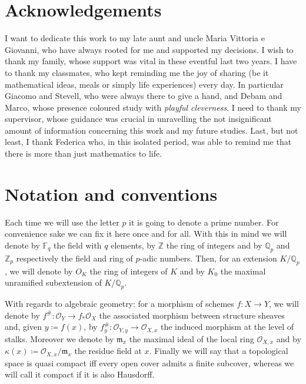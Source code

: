 \section*{Acknowledgements}
I want to dedicate this work to my late aunt and uncle Maria Vittoria e Giovanni,
who have always rooted for me and supported my decisions.
I wish to thank my family, whose support was vital in these eventful last two years.
I have to thank my classmates, who kept reminding me the joy of sharing
(be it mathematical ideas, meals or simply life experiences) every day.
In particular Giacomo and Stevell, who were always there to give a hand, and 
Debam and Marco, whose presence coloured study with \emph{playful cleverness}.
I need to thank my supervisor, whose guidance was crucial in unravelling
the not insignificant amount of information concerning this work and my future studies.
Last, but not least, I thank Federica who, in this isolated period,
was able to remind me that there is more than just mathematics to life.
\newpage


\section*{Notation and conventions}
Each time we will use the letter $p$ it is going to denote a prime number.
For convenience sake we can fix it here once and for all.
With this in mind we will denote by $\mathbb{F}_{q}$ the field with $q$ elements,
by $\mathbb{Z}$ the ring of integers and by $\mathbb{Q}_p$ and $\mathbb{Z}_{p}$
respectively the field and ring of $p$-adic numbers.
Then, for an extension $K/\mathbb{Q}_p$, we will denote by $O_K$ the ring of
integers of $K$ and by $K_0$ the maximal unramified subextension of $K/\mathbb{Q}_p$.

With regards to algebraic geometry: for a morphism of schemes $f\colon X \to Y$,
we will denote by $f^{\#}\colon \mathcal{O}_{ Y } \to f_*\mathcal{O}_{ X }$ the
associated morphism between structure sheaves and, given $y \coloneqq f(x)$,
by $f_y^{\#}\colon \mathcal{O}_{ Y,y } \to \mathcal{O}_{ X,x }$ the induced morphism
at the level of stalks.
Moreover we denote by $\mathfrak{m}_x$ the maximal ideal of the local ring
$\mathcal{O}_{ X,x }$ and by $\kappa(x) \coloneqq \mathcal{O}_{ X,x }/\mathfrak{m}_x$
the residue field at $x$.
Finally we will say that a topological space is quasi compact
iff every open cover admits a finite subcover, whereas
we will call it compact if it is also Hausdorff.


